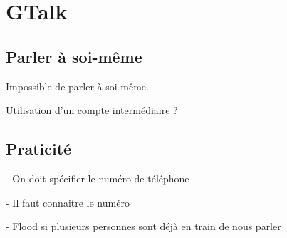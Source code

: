 
\section{GTalk}


\subsection{Parler à soi-même}

Impossible de parler à soi-même.

Utilisation d'un compte intermédiaire ?
\\




\subsection{Praticité}

- On doit spécifier le numéro de téléphone

- Il faut connaitre le numéro

- Flood si plusieurs personnes sont déjà en train de nous parler
\\
